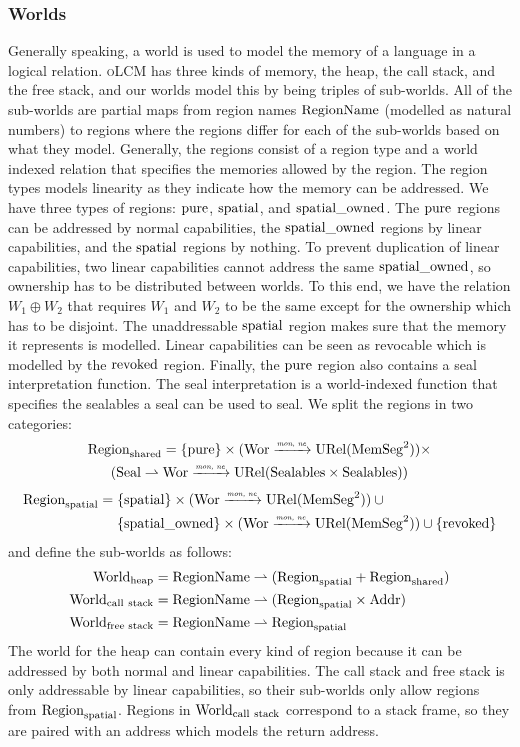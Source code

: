 \documentclass[acmsmall,review,anonymous]{acmart}\settopmatter{printfolios=true,printccs=false,printacmref=false}
\renewcommand{\MemSeg}{\shareddom{MemSeg}}
\renewcommand{\SealableCaps}{\shareddom{Sealables}}
\renewcommand{\Worlds}{\World_{\mathrm{call\ stack}}}
\newcommand{\srccm}{\textsc{oLCM}}
\begin{document}
\subsubsection{Worlds}
\label{subsec:worlds}
Generally speaking, a world is used to model the memory of a language in a logical relation.
\srccm{} has three kinds of memory, the heap, the call stack, and the free stack, and our worlds model this by being triples of sub-worlds.
All of the sub-worlds are partial maps from region names $\mathrm{RegionName}$ (modelled as natural numbers) to regions where the regions differ for each of the sub-worlds based on what they model.
Generally, the regions consist of a region type and a world indexed relation that specifies the memories allowed by the region.
The region types models linearity as they indicate how the memory can be addressed.
We have three types of regions: $\mathrm{pure}$, $\mathrm{spatial}$, and $\mathrm{spatial\_owned}$.
The $\mathrm{pure}$ regions can be addressed by normal capabilities, the $\mathrm{spatial\_owned}$ regions by linear capabilities, and the $\mathrm{spatial}$ regions by nothing.
To prevent duplication of linear capabilities, two linear capabilities cannot address the same $\mathrm{spatial\_owned}$, so ownership has to be distributed between worlds.
To this end, we have the relation $W_1 \oplus W_2$ that requires $W_1$ and $W_2$ to be the same except for the ownership which has to be disjoint.
The unaddressable $\mathrm{spatial}$ region makes sure that the memory it represents is modelled.
Linear capabilities can be seen as revocable which is modelled by the $\mathrm{revoked}$ region.
Finally, the $\mathrm{pure}$ region also contains a seal interpretation function.
The seal interpretation is a world-indexed function that specifies the sealables a seal can be used to seal.
We split the regions in two categories:
\begin{multline*}
  \Regionh = 
  \{\pure \} \times (\Wor \monnefun \URel{\MemSeg^2}) \times \\
  (\Seal \parfun \Wor \monnefun \URel{\SealableCaps \times \SealableCaps})
\end{multline*}
\begin{align*}
  \Regions ={} &
    \{\spatial \} \times (\Wor \monnefun \URel{\MemSeg^2}) \cup{} \\
    & \{\spatialo \} \times (\Wor \monnefun \URel{\MemSeg^2})\cup
    \{\revoked\}
\end{align*}
and define the sub-worlds as follows:
\begin{align*}
  \Worldh  &={} \RegionName \parfun (\Regions + \Regionh)\\
  \Worlds  &={} \RegionName \parfun (\Regions \times \Addr)\\
  \Worldfs &={} \RegionName \parfun \Regions
\end{align*}
The world for the heap can contain every kind of region because it can be addressed by both normal and linear capabilities.
The call stack and free stack is only addressable by linear capabilities, so their sub-worlds only allow regions from $\mathrm{Region}_\mathrm{spatial}$.
Regions in $\Worlds$ correspond to a stack frame, so they are paired with an address which models the return address.
\end{document}
